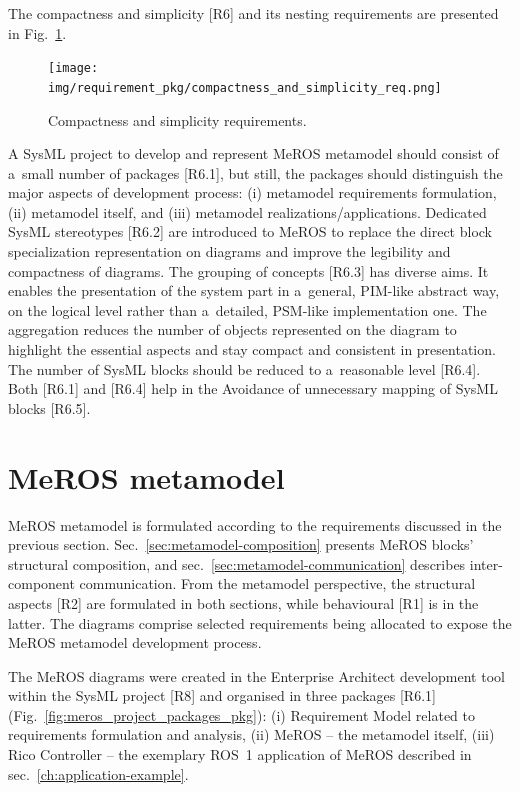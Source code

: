 \documentclass[11pt,oneside,a4paper]{report}
\begin{document}
			
	The compactness and simplicity [R6] and its nesting requirements are presented in Fig.~\ref{fig:compactness_and_simplicity_req}. 
	
	\begin{figure}[H]
		\centering
		\begin{center}
			{\texttt{[image: img/requirement\_pkg/compactness\_and\_simplicity\_req.png]}}
		\end{center}
		\caption{Compactness and simplicity requirements.} 
		\label{fig:compactness_and_simplicity_req}
	\end{figure}
	
	A SysML project to develop and represent MeROS metamodel should consist of a~small number of packages [R6.1], but still, the packages should distinguish the major aspects of development process: (i) metamodel requirements formulation, (ii) metamodel itself, and (iii) metamodel realizations/applications.
	Dedicated SysML stereotypes [R6.2] are introduced to MeROS to replace the direct block specialization representation on diagrams and improve the legibility and compactness of diagrams.
	The grouping of concepts [R6.3] has diverse aims. It enables the presentation of the system part in a~general, PIM-like abstract way, on the logical level rather than a~detailed, PSM-like implementation one. The aggregation reduces the number of objects represented on the diagram to highlight the essential aspects and stay compact and consistent in presentation.
	The number of SysML blocks should be reduced to a~reasonable level [R6.4]. Both [R6.1] and [R6.4] help in the Avoidance of unnecessary mapping of SysML blocks [R6.5].

	
	
\chapter{MeROS metamodel}
\label{ch:metamodel}
	
	MeROS metamodel is formulated according to the requirements discussed in the previous section. Sec.~\ref{sec:metamodel-composition} presents MeROS blocks' structural composition, and sec.~\ref{sec:metamodel-communication} describes inter-component communication. From the metamodel perspective, the structural aspects [R2] are formulated in both sections, while behavioural [R1] is in the latter. The diagrams comprise selected requirements being allocated to expose the MeROS metamodel development process. 
	
	The MeROS diagrams were created in the Enterprise Architect development tool within the SysML project [R8] and organised in three packages [R6.1] (Fig.~\ref{fig:meros_project_packages_pkg}): (i) Requirement Model related to requirements formulation and analysis, (ii) MeROS -- the metamodel itself, (iii) Rico Controller -- the exemplary ROS~1 application of MeROS described in sec.~\ref{ch:application-example}. 
	
\end{document}
